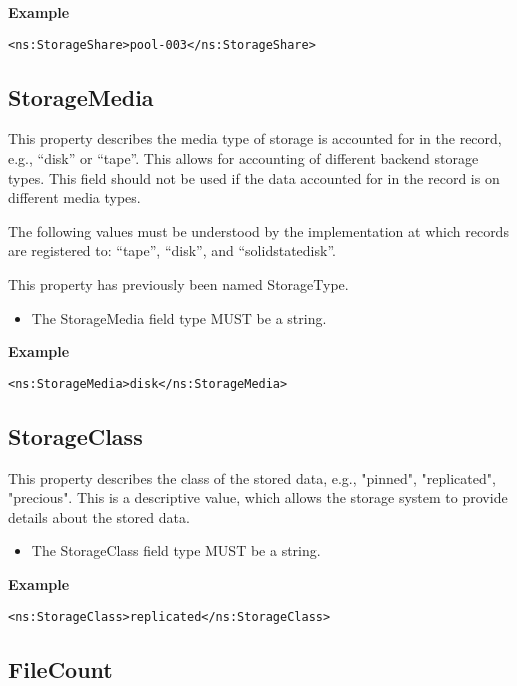{\bf Example}
\begin{verbatim}
<ns:StorageShare>pool-003</ns:StorageShare>
\end{verbatim}


\subsection{StorageMedia}

This property describes the media type of storage is accounted for in the
record, e.g., ``disk'' or ``tape''. This allows for accounting of different
backend storage types. This field should not be used if the data accounted for
in the record is on different media types.

The following values must be understood by the implementation at which records
are registered to: ``tape'', ``disk'', and ``solidstatedisk''.

This property has previously been named StorageType.

\begin{itemize}
\item The StorageMedia field type MUST be a string.
\end{itemize}

{\bf Example}
\begin{verbatim}
<ns:StorageMedia>disk</ns:StorageMedia>
\end{verbatim}



\subsection{StorageClass}

This property describes the class of the stored data, e.g., "pinned",
"replicated", "precious". This is a descriptive value, which allows the storage
system to provide details about the stored data.

\begin{itemize}
\item The StorageClass field type MUST be a string.
\end{itemize}

{\bf Example}
\begin{verbatim}
<ns:StorageClass>replicated</ns:StorageClass>
\end{verbatim}


\subsection{FileCount}

